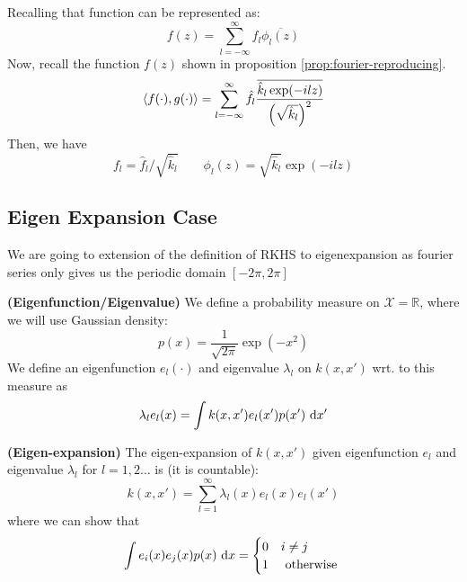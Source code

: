 \begin{remark}
    Recalling that function can be represented as:
    \begin{equation*}
        f(z) = \sum^\infty_{l=-\infty} f_l\overline{\phi_l(z)}
    \end{equation*}
    Now, recall the function $f(z)$ shown in proposition \ref{prop:fourier-reproducing}. 
    \begin{equation*}
        \left\langle f(\cdot), g(\cdot) \right\rangle = \sum^\infty_{l=-\infty} \hat{f}_l\frac{\overline{\hat{k}_l\exp(-ilz)}}{\left( \sqrt{\hat{k}_l} \right)^2}
    \end{equation*}
    Then, we have 
    \begin{equation*}
        f_l = \hat{f}_l/\sqrt{\hat{k}_l} \qquad \phi_l(z) = \sqrt{\hat{k}_l}\exp(-ilz)
    \end{equation*}
\end{remark}

\subsection{Eigen Expansion Case}

\begin{remark}
    We are going to extension of the definition of RKHS to eigenexpansion as fourier series only gives us the periodic domain $[-2\pi, 2\pi]$
\end{remark}

\begin{definition}{\textbf{(Eigenfunction/Eigenvalue)}}
    We define a probability measure on $\mathcal{X}=\mathbb{R}$, where we will use Gaussian density:
    \begin{equation*}
        p(x) = \frac{1}{\sqrt{2\pi}}\exp(-x^2)
    \end{equation*}
    We define an eigenfunction $e_l(\cdot)$ and eigenvalue $\lambda_l$ on $k(x,x')$ wrt. to this measure as 
    \begin{equation*}
        \lambda_le_l(x) = \int k(x,x')e_l(x')p(x')\ \mathrm{d} x'
    \end{equation*}
\end{definition}

\begin{definition}{\textbf{(Eigen-expansion)}}
    The eigen-expansion of $k(x, x')$ given eigenfunction $e_l$ and eigenvalue $\lambda_l$ for $l=1,2\dots$ is (it is countable):
    \begin{equation*}
        k(x, x') = \sum^\infty_{l=1}\lambda_l(x)e_l(x)e_l(x')
    \end{equation*}
    where we can show that 
    \begin{equation*}
        \int e_i(x)e_j(x)p(x)\ \mathrm{d} x = \begin{cases}
            0 & i\ne j \\
            1 & \text{ otherwise }
        \end{cases}
    \end{equation*}
\end{definition}

